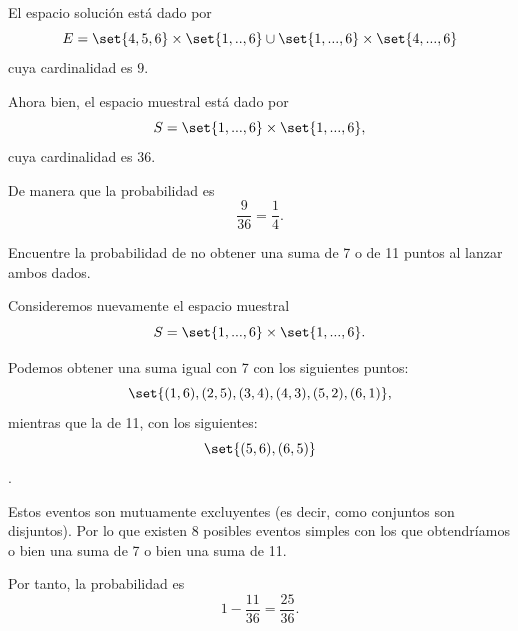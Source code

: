 \begin{solucion}
	\label{solucion:2.5}
	El espacio solución está dado por 
	\begin{equation}
		E = \set{4,5,6}\times \set{1,..,6} \cup \set{1,...,6}\times\set{4,...,6}
	\end{equation}
cuya cardinalidad es $ 9 $. 

Ahora bien, el espacio muestral está dado por
\begin{equation}
	S = \set{1,...,6}\times\set{1,...,6},
\end{equation}
cuya cardinalidad es $ 36 $.

De manera que la probabilidad es 
\begin{equation}
	\dfrac{9}{36}=\dfrac{1}{4}.
\end{equation}

\end{solucion}

\begin{problema}
	\label{problema:2.6}
	Encuentre la probabilidad de no obtener una suma de 7 o de 11 puntos al lanzar ambos dados.
\end{problema}


\begin{solucion}
	\label{solucion:2.6}
	Consideremos nuevamente el espacio muestral 
	\begin{equation}
		S = \set{1,...,6}\times\set{1,...,6}.
	\end{equation}

	Podemos obtener una suma igual con 7 con los siguientes puntos:
	\begin{equation}
		\set{(1,6),(2,5),(3,4),(4,3),(5,2),(6,1)}, 
	\end{equation}
	mientras que la de 11, con los siguientes:
	\begin{equation}\label{key}
		\set{(5,6), (6,5)}
	\end{equation}.

	Estos eventos son mutuamente excluyentes (es decir, como conjuntos son disjuntos). Por lo que existen 8 posibles eventos simples con los que obtendríamos o bien una suma de 7 o bien una suma de 11.
	
	Por tanto, la probabilidad es
	\begin{equation}\label{key}
		1-\dfrac{11}{36}=\dfrac{25}{36}.
	\end{equation}
\end{solucion}